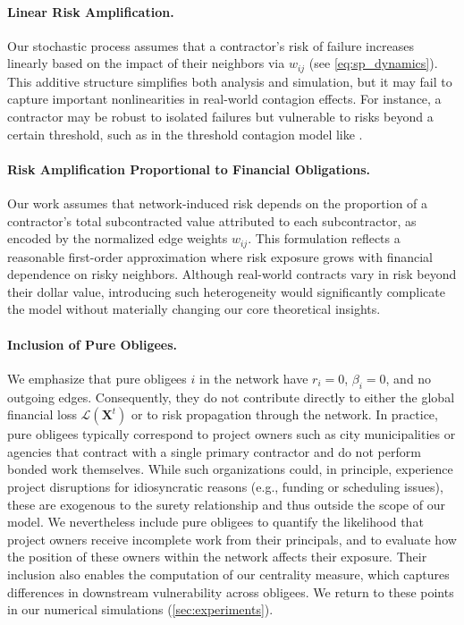 \documentclass[mnsc,nonblindrev]{informs3}
\newcommand{\GAR}{\mathcal{L}}
\newcommand{\Xvec}{\mathbf{X}}
\begin{document}
\paragraph{Linear Risk Amplification.} Our stochastic process assumes that a contractor’s risk of failure increases linearly based on the impact of their neighbors via $w_{ij}$ (see \cref{eq:sp_dynamics}). This additive structure simplifies both analysis and simulation, but it may fail to capture important nonlinearities in real-world contagion effects. For instance, a contractor may be robust to isolated failures but vulnerable to risks beyond a certain threshold, such as in the threshold contagion model like \citet{watts2002simple}.

\paragraph{Risk Amplification Proportional to Financial Obligations.} Our work assumes that network-induced risk depends on the proportion of a contractor’s total subcontracted value attributed to each subcontractor, as encoded by the normalized edge weights $w_{ij}$. This formulation reflects a reasonable first-order approximation where risk exposure grows with financial dependence on risky neighbors. Although real-world contracts vary in risk beyond their dollar value, introducing such heterogeneity would significantly complicate the model without materially changing our core theoretical insights.

\paragraph{Inclusion of Pure Obligees.}
We emphasize that pure obligees $i$ in the network have $r_i = 0$, $\beta_i = 0$, and no outgoing edges. Consequently, they do not contribute directly to either the global financial loss $\GAR(\Xvec^t)$ or to risk propagation through the network. In practice, pure obligees typically correspond to project owners such as city municipalities or agencies that contract with a single primary contractor and do not perform bonded work themselves. While such organizations could, in principle, experience project disruptions for idiosyncratic reasons (e.g., funding or scheduling issues), these are exogenous to the surety relationship and thus outside the scope of our model. We nevertheless include pure obligees to quantify the likelihood that project owners receive incomplete work from their principals, and to evaluate how the position of these owners within the network affects their exposure. Their inclusion also enables the computation of our centrality measure, which captures differences in downstream vulnerability across obligees. We return to these points in our numerical simulations (\cref{sec:experiments}).
\end{document}
